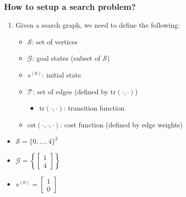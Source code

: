 \subsubsection{How to setup a search problem?}
\begin{process} 
    \begin{enumerate}
        \item Given a search graph, we need to define the following:
        \begin{itemize}
            \item $\mathcal{S}$: set of vertices
            \item $\mathcal{G}$: goal states (subset of $\mathcal{S}$)
            \item $s^{(0)}$: initial state
            \item $\mathcal{T}$: set of edges (defined by $\text{tr}(\cdot, \cdot)$)
            \begin{itemize}
                \item $\text{tr}(\cdot, \cdot)$: transition function
            \end{itemize}
            \item $\text{cst}(\cdot, \cdot, \cdot)$: cost function (defined by edge weights)
        \end{itemize}
    \end{enumerate}
\end{process}

\begin{example}
\end{example}
\newpage

\begin{example}
    \begin{itemize}
        \item $\mathcal{S} = \{0,\ldots,4 \}^2$
        \item $\mathcal{G} = \left\{ \begin{bmatrix}
            1 \\
            4
        \end{bmatrix} \right\}$
        \item $s^{(0)} = \begin{bmatrix}
            1 \\
            0
        \end{bmatrix}$
    \end{itemize}
\end{example}
\newpage

